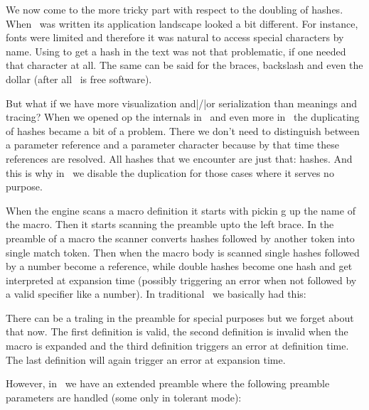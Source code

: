 We now come to the more tricky part with respect to the doubling of hashes. When
\TEX\ was written its application landscape looked a bit different. For instance,
fonts were limited and therefore it was natural to access special characters by
name. Using \type {\#} to get a hash in the text was not that problematic, if one
needed that character at all. The same can be said for the braces, backslash and
even the dollar (after all \TEX\ is free software).

But what if we have more visualization and|/|or serialization than meanings and
tracing? When we opened op the internals in \LUATEX\ and even more in
\LUAMETATEX\ the duplicating of hashes became a bit of a problem. There we don't
need to distinguish between a parameter reference and a parameter character
because by that time these references are resolved. All hashes that we encounter
are just that: hashes. And this is why in \LUAMETATEX\ we disable the duplication
for those cases where it serves no purpose.

When the engine scans a macro definition it starts with pickin  g up the name of
the macro. Then it starts scanning the preamble upto the left brace. In the
preamble of a macro the scanner converts hashes followed by another token into
single match token. Then when the macro body is scanned single hashes followed by
a number become a reference, while double hashes become one hash and get
interpreted at expansion time (possibly triggering an error when not followed by
a valid specifier like a number). In traditional \TEX\ we basically had this:

\starttyping
\def\test#1{#1}
\def\test#1{##}
\def\test#1{#X}
\def\test#1{##1}
\stoptyping

There can be a traling \type {#} in the preamble for special purposes but we
forget about that now. The first definition is valid, the second definition is
invalid when the macro is expanded and the third definition triggers an error at
definition time. The last definition will again trigger an error at expansion
time.

However, in \LUAMETATEX\ we have an extended preamble where the following
preamble parameters are handled (some only in tolerant mode):


